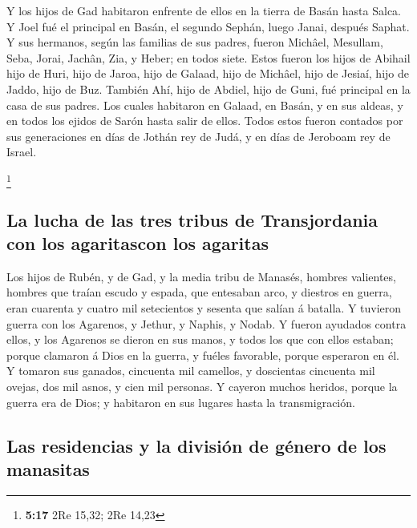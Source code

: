  Y los hijos de Gad habitaron enfrente de ellos en la
tierra de Basán hasta Salca.  Y Joel fué el principal en
Basán, el segundo Sephán, luego Janai, después Saphat.  Y
sus hermanos, según las familias de sus padres, fueron Michâel,
Mesullam, Seba, Jorai, Jachân, Zia, y Heber; en todos siete.
 Estos fueron los hijos de Abihail hijo de Huri, hijo de
Jaroa, hijo de Galaad, hijo de Michâel, hijo de Jesiaí, hijo de Jaddo,
hijo de Buz.  También Ahí, hijo de Abdiel, hijo de Guni,
fué principal en la casa de sus padres.  Los cuales
habitaron en Galaad, en Basán, y en sus aldeas, y en todos los ejidos de
Sarón hasta salir de ellos.  Todos estos fueron contados
por sus generaciones en días de Jothán rey de Judá, y en días de
Jeroboam rey de Israel.

\footnote{\textbf{5:17} 2Re 15,32; 2Re 14,23}

\hypertarget{la-lucha-de-las-tres-tribus-de-transjordania-con-los-agaritascon-los-agaritas}{%
\subsection{La lucha de las tres tribus de Transjordania con los
agaritascon los
agaritas}\label{la-lucha-de-las-tres-tribus-de-transjordania-con-los-agaritascon-los-agaritas}}

 Los hijos de Rubén, y de Gad, y la media tribu de
Manasés, hombres valientes, hombres que traían escudo y espada, que
entesaban arco, y diestros en guerra, eran cuarenta y cuatro mil
setecientos y sesenta que salían á batalla.  Y tuvieron
guerra con los Agarenos, y Jethur, y Naphis, y Nodab.  Y
fueron ayudados contra ellos, y los Agarenos se dieron en sus manos, y
todos los que con ellos estaban; porque clamaron á Dios en la guerra, y
fuéles favorable, porque esperaron en él.  Y tomaron sus
ganados, cincuenta mil camellos, y doscientas cincuenta mil ovejas, dos
mil asnos, y cien mil personas.  Y cayeron muchos
heridos, porque la guerra era de Dios; y habitaron en sus lugares hasta
la transmigración.

\hypertarget{las-residencias-y-la-divisiuxf3n-de-guxe9nero-de-los-manasitas}{%
\subsection{Las residencias y la división de género de los
manasitas}\label{las-residencias-y-la-divisiuxf3n-de-guxe9nero-de-los-manasitas}}

